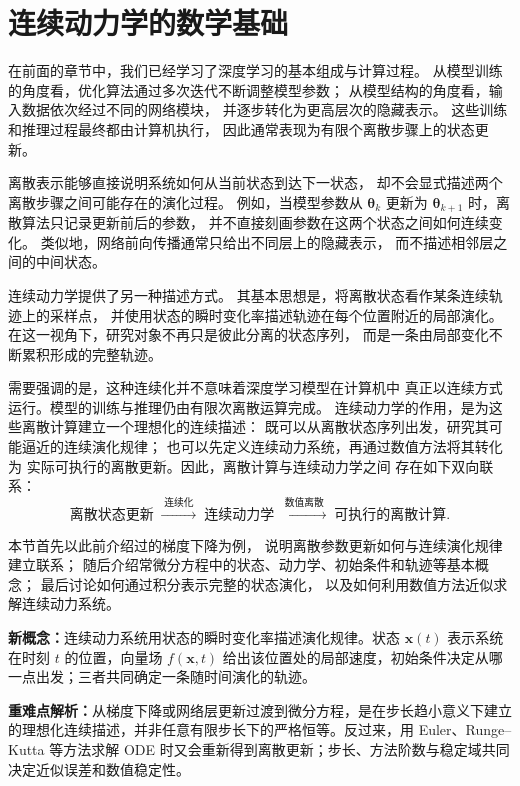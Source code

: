 \documentclass[UTF8,a4paper,zihao=-4,oneside,openany]{ctexbook}
\begin{document}
\section{连续动力学的数学基础}
\label{sec:discrete-to-continuous-dynamics}

在前面的章节中，我们已经学习了深度学习的基本组成与计算过程。
从模型训练的角度看，优化算法通过多次迭代不断调整模型参数；
从模型结构的角度看，输入数据依次经过不同的网络模块，
并逐步转化为更高层次的隐藏表示。
这些训练和推理过程最终都由计算机执行，
因此通常表现为有限个离散步骤上的状态更新。

离散表示能够直接说明系统如何从当前状态到达下一状态，
却不会显式描述两个离散步骤之间可能存在的演化过程。
例如，当模型参数从
\(\boldsymbol{\theta}_k\)
更新为
\(\boldsymbol{\theta}_{k+1}\)
时，离散算法只记录更新前后的参数，
并不直接刻画参数在这两个状态之间如何连续变化。
类似地，网络前向传播通常只给出不同层上的隐藏表示，
而不描述相邻层之间的中间状态。

连续动力学提供了另一种描述方式。
其基本思想是，将离散状态看作某条连续轨迹上的采样点，
并使用状态的瞬时变化率描述轨迹在每个位置附近的局部演化。
在这一视角下，研究对象不再只是彼此分离的状态序列，
而是一条由局部变化不断累积形成的完整轨迹。

需要强调的是，这种连续化并不意味着深度学习模型在计算机中
真正以连续方式运行。模型的训练与推理仍由有限次离散运算完成。
连续动力学的作用，是为这些离散计算建立一个理想化的连续描述：
既可以从离散状态序列出发，研究其可能逼近的连续演化规律；
也可以先定义连续动力系统，再通过数值方法将其转化为
实际可执行的离散更新。因此，离散计算与连续动力学之间
存在如下双向联系：
\begin{equation}
    \text{离散状态更新}
    \;\xrightarrow{\;\text{连续化}\;}\;
    \text{连续动力学}
    \;\xrightarrow{\;\text{数值离散}\;}\;
    \text{可执行的离散计算}.
    \label{eq:discrete-continuous-discrete}
\end{equation}

本节首先以此前介绍过的梯度下降为例，
说明离散参数更新如何与连续演化规律建立联系；
随后介绍常微分方程中的状态、动力学、初始条件和轨迹等基本概念；
最后讨论如何通过积分表示完整的状态演化，
以及如何利用数值方法近似求解连续动力系统。

\begin{importantnote}
\textbf{新概念：}连续动力系统用状态的瞬时变化率描述演化规律。状态 \(\boldsymbol{x}(t)\) 表示系统在时刻 \(t\) 的位置，向量场 \(f(\boldsymbol{x},t)\) 给出该位置处的局部速度，初始条件决定从哪一点出发；三者共同确定一条随时间演化的轨迹。

\textbf{重难点解析：}从梯度下降或网络层更新过渡到微分方程，是在步长趋小意义下建立的理想化连续描述，并非任意有限步长下的严格恒等。反过来，用 Euler、Runge--Kutta 等方法求解 ODE 时又会重新得到离散更新；步长、方法阶数与稳定域共同决定近似误差和数值稳定性。
\end{importantnote}
\end{document}
